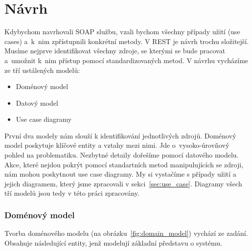 \chapter{Návrh}

\indent

Kdybychom navrhovali SOAP službu, vzali bychom všechny případy užití (use cases) a~k~nim zpřístupnili
konkrétní metody. V REST je návrh trochu složitejší.
Musíme nejprve identifikovat všechny zdroje, se kterými se bude pracovat a~umožnit
k~nim přístup pomocí standardizovaných metod. V návrhu vycházíme ze tří ustálených modelů:

\begin{itemize}
\item Doménový model
\item Datový model
\item Use case diagramy
\end{itemize}

První dva modely nám slouží k identifikování jednotlivých zdrojů.
Doménový model poskytuje klíčové entity a vztahy mezi nimi.
Jde o~vysoko-úrovňový pohled na problematiku. Nezbytné detaily dořešíme pomocí datového modelu. 
Akce, které nejdou pokrýt pomocí standartních metod manipulujících se zdroji, nám mohou poskytnout use case diagramy.
My si vystačíme s případy užití a jejich diagramem, který jsme zpracovali v sekci~\ref{sec:use_case}. 
Diagramy všech tří modelů jsou tedy v této práci zpracovány.

\subsection{Doménový model}

\indent

Tvorba doménového modelu (na obrázku~\ref{fig:domain_model}) vychází ze zadání. Obsahuje následující entity,
jenž modelují základní představu o systému.

